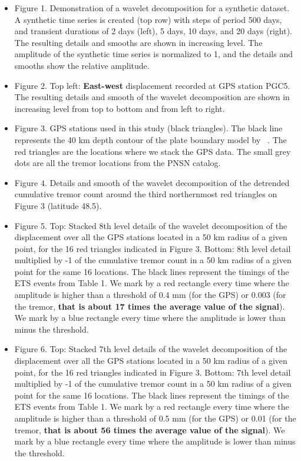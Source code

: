 \documentclass{article}
\begin{document}
\begin{itemize}

\item Figure 1. Demonstration of a wavelet decomposition for a synthetic dataset. A synthetic time series is created (top row) with steps of period 500 days, and transient durations of 2 days (left), 5 days, 10 days, and 20 days (right). The resulting details and smooths are shown in increasing level. The amplitude of the synthetic time series is normalized to 1, and the details and smooths show the relative amplitude.

\item Figure 2. Top left: \textbf{East-west} displacement recorded at GPS station PGC5. The resulting details and smooth of the wavelet decomposition are shown in increasing level from top to bottom and from left to right.

\item Figure 3. GPS stations used in this study (black triangles). The black line represents the 40 km depth contour of the plate boundary model by ~\citet{PRE_2003}. The red triangles are the locations where we stack the GPS data. The small grey dots are all the tremor locations from the PNSN catalog.

\item Figure 4. Details and smooth of the wavelet decomposition of the detrended cumulative tremor count around the third northernmost red triangles on Figure 3 (latitude 48.5).

\item Figure 5. Top: Stacked 8th level details of the wavelet decomposition of the displacement over all the GPS stations located in a 50 km radius of a given point, for the 16 red triangles indicated in Figure 3. Bottom: 8th level detail multiplied by -1 of the cumulative tremor count in a 50 km radius of a given point for the same 16 locations. The black lines represent the timings of the ETS events from Table 1. We mark by a red rectangle every time where the amplitude is higher than a threshold of 0.4 mm (for the GPS) or 0.003 (for the tremor, \textbf{that is about 17 times the average value of the signal}). We mark by a blue rectangle every time where the amplitude is lower than minus the threshold.

\item Figure 6. Top: Stacked 7th level details of the wavelet decomposition of the displacement over all the GPS stations located in a 50 km radius of a given point, for the 16 red triangles indicated in Figure 3. Bottom: 7th level detail multiplied by -1 of the cumulative tremor count in a 50 km radius of a given point for the same 16 locations. The black lines represent the timings of the ETS events from Table 1. We mark by a red rectangle every time where the amplitude is higher than a threshold of 0.5 mm (for the GPS) or 0.01 (for the tremor, \textbf{that is about 56 times the average value of the signal}). We mark by a blue rectangle every time where the amplitude is lower than minus the threshold.


\end{itemize}
\end{document}
